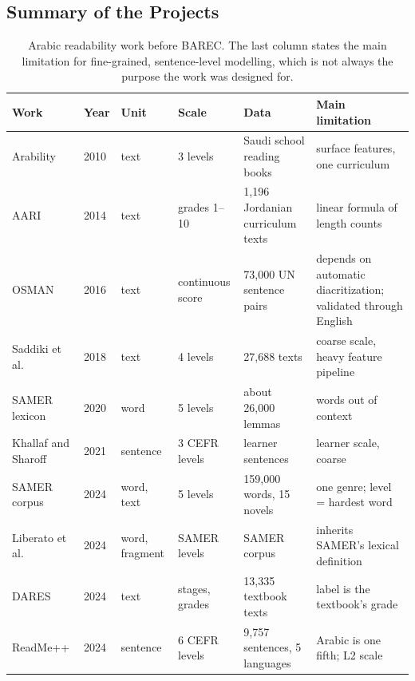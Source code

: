 \subsection{Summary of the Projects}

\begin{table}[H]
\centering
\footnotesize
\caption{Arabic readability work before BAREC. The last column states the main limitation for
fine-grained, sentence-level modelling, which is not always the purpose the work was designed
for.}
\label{tab:lit-prebarec}
\setlength{\tabcolsep}{3pt}
\begin{tabular}{p{2.3cm} p{0.8cm} p{1.3cm} p{1.7cm} p{2.4cm} p{2.9cm}}
\toprule
\textbf{Work} & \textbf{Year} & \textbf{Unit} & \textbf{Scale} & \textbf{Data} &
\textbf{Main limitation} \\
\midrule
Arability \cite{al2010automatic} & 2010 & text & 3 levels & Saudi school reading books &
surface features, one curriculum \\
AARI \cite{altamimi2014aari} & 2014 & text & grades 1--10 & 1{,}196 Jordanian curriculum texts &
linear formula of length counts \\
OSMAN \cite{elhaj2016osman} & 2016 & text & continuous score & 73{,}000 UN sentence pairs &
depends on automatic diacritization; validated through English \\
Saddiki et al.\ \cite{saddiki2018feature} & 2018 & text & 4 levels & 27{,}688 texts &
coarse scale, heavy feature pipeline \\
SAMER lexicon \cite{alkhalil2020samer} & 2020 & word & 5 levels & about 26{,}000 lemmas &
words out of context \\
Khallaf and Sharoff \cite{khallaf2021automatic} & 2021 & sentence & 3 CEFR levels & learner
sentences & learner scale, coarse \\
SAMER corpus \cite{alhafni2024samer} & 2024 & word, text & 5 levels & 159{,}000 words, 15 novels &
one genre; level = hardest word \\
Liberato et al.\ \cite{liberato2024strategies} & 2024 & word, fragment & SAMER levels & SAMER
corpus & inherits SAMER's lexical definition \\
DARES \cite{elhaj2024dares} & 2024 & text & stages, grades & 13{,}335 textbook texts & label is
the textbook's grade \\
ReadMe++ \cite{naous2024readme} & 2024 & sentence & 6 CEFR levels & 9{,}757 sentences, 5
languages & Arabic is one fifth; L2 scale \\
\bottomrule
\end{tabular}
\end{table}

